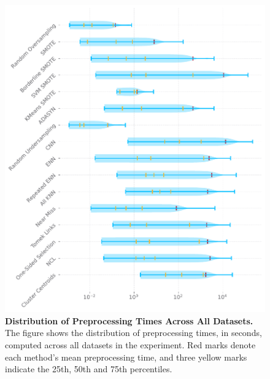\begin{figure}
    \centering
    \includegraphics[width=\linewidth]{figures/preprocessing_times.pdf}
    \caption{
        \textbf{Distribution of Preprocessing Times Across All Datasets.} The figure shows the
        distribution of preprocessing times, in seconds, computed across all datasets in the
        experiment. Red marks denote each method's mean preprocessing time, and three yellow marks
        indicate the 25th, 50th and 75th percentiles.
    }
    \label{figure:preprocessing-times}
\end{figure}
